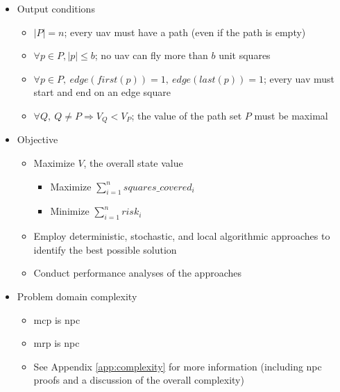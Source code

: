 \documentclass[../main.tex]{subfiles}
\begin{document}
\begin{itemize}
    \item Output conditions
    \begin{itemize}
        \item $|P|=n$; every \ac{uav} must have a path (even if the path is empty)
        \item $\forall p\in P, |p|\leq b$; no \ac{uav} can fly more than $b$ unit squares
        \item $\forall p\in P, \ edge(first(p)) = 1, \ edge(last(p)) = 1$; every \ac{uav} must start and end on an edge square
        \item $\forall Q, \ Q\neq P \Rightarrow V_Q<V_P$; the value of the path set $P$ must be maximal
    \end{itemize}

    \pagebreak

    \item Objective
    \begin{itemize}
        \item Maximize $V$, the overall state value
        \begin{itemize}
            \item Maximize $\sum_{i=1}^{n}{squares\_covered_i}$
            \item Minimize $\sum_{i=1}^{n}{risk_i}$
        \end{itemize}

        \item Employ deterministic, stochastic, and local algorithmic approaches to identify the best possible solution
        \item Conduct performance analyses of the approaches
    \end{itemize}
    
    \item Problem domain complexity
    \begin{itemize}
        \item \ac{mcp} is \ac{npc}
        \item \ac{mrp} is \ac{npc}
        \item See Appendix \ref{app:complexity} for more information (including \ac{npc} proofs and a discussion of the overall \probs complexity)
    \end{itemize}
\end{itemize}
\end{document}
